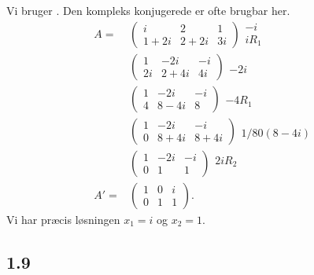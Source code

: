 		Vi bruger \cite[Sætning 1.2.18]{hesselholt2017}. Den kompleks konjugerede er ofte brugbar her.
			\begin{align*}
				A=&\left(\begin{array}{rr|r} {i} & {2} & {1} \\ {1+2i} & {2+2i} & {3i}  \end{array}\right)\begin{array}{c} -i \\ iR_1 \end{array}\\
				&\left(\begin{array}{rr|r} {1} & {-2i} & {-i} \\ {2i} & {2+4i} & {4i}  \end{array}\right)\begin{array}{c} \, \\ -2i \end{array}\\
				&\left(\begin{array}{rr|r} {1} & {-2i} & {-i} \\ {4} & {8-4i} & {8}  \end{array}\right)\begin{array}{c} \, \\ -4R_1 \end{array}\\
				&\left(\begin{array}{rr|r} {1} & {-2i} & {-i} \\ {0} & {8+4i} & {8+4i}  \end{array}\right)\begin{array}{c} \, \\ 1/80(8-4i) \end{array}\\
				&\left(\begin{array}{rr|r} {1} & {-2i} & {-i} \\ {0} & {1} & {1}  \end{array}\right)\begin{array}{c} 2iR_2 \\ \, \end{array}\\
				A'=&\left(\begin{array}{rr|r} {1} & {0} & {i} \\ {0} & {1} & {1}  \end{array}\right).
			\end{align*} 
		Vi har præcis løsningen $x_1=i$ og $x_2=1$.

		\subsection{1.9}

